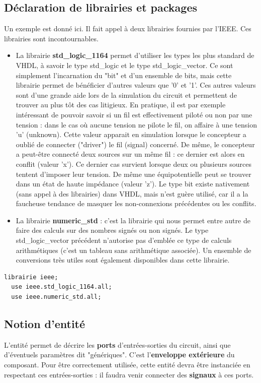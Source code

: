 \subsection{Déclaration de librairies et packages}
Un exemple est donné ici. Il fait appel à deux librairies fournies par l'IEEE. Ces librairies sont incontournables.
\begin{itemize}
  \item La librairie \textbf{std\_logic\_1164} permet d'utiliser les types les plus standard de VHDL, à savoir le type std\_logic et le type std\_logic\_vector.
  Ce sont simplement l'incarnation du "bit" et d'un ensemble de bits, mais cette librairie permet de bénéficier d'autres valeurs que '0' et '1'. Ces autres valeurs sont d'une grande aide lors de la simulation du circuit et
  permettent de trouver au plus tôt des cas litigieux.
  En pratique, il est par exemple intéressant de pouvoir savoir si un fil est effectivement piloté ou non par une tension : dans le cas où aucune tension ne pilote le fil,
  on affaire à une tension 'u' (unknown). Cette valeur apparait en simulation lorsque le concepteur a oublié de connecter ("driver") le fil (signal) concerné. De même, le concepteur
  a peut-être connecté deux sources sur un même fil :  ce dernier est alors en conflit (valeur 'x'). Ce dernier cas survient lorsque deux ou plusieurs sources tentent d'imposer leur tension. De même une équipotentielle peut se trouver dans un état de haute impédance (valeur 'z').
  Le type bit existe nativement (sans appel à des librairies) dans VHDL, mais n'est guère utilisé, car il a la faucheuse tendance de masquer les non-connexions précédentes ou les conflits.
 \item  La librairie \textbf{numeric\_std} : c'est la librairie qui nous permet entre autre de faire des calculs sur des nombres signés ou non signés. Le type std\_logic\_vector précédent
 n'autorise pas d'emblée ce type de calculs arithmétiques (c'est un tableau sans arithmétique associée). Un ensemble de conversions très utiles sont également disponibles dans cette librairie.
\end{itemize}

\lstset{basicstyle=\small,language=VHDL}
\begin{lstlisting}[frame=single]
  librairie ieee;
  use ieee.std_logic_1164.all;
  use ieee.numeric_std.all;
\end{lstlisting}


\subsection{Notion d'entité}
L'entité permet de décrire les \textbf{ports} d'entrées-sorties du circuit, ainsi que d'éventuels paramètres dit "génériques". C'est l'\textbf{enveloppe extérieure} du composant.
Pour être correctement utilisée, cette entité devra être instanciée en respectant ces entrées-sorties : il faudra venir connecter des \textbf{signaux} à ces ports.

